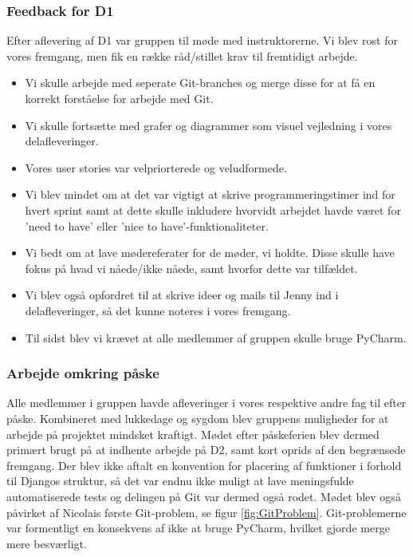 \documentclass[]{article}
\begin{document}
\subsubsection{Feedback for D1}
Efter aflevering af D1 var gruppen til møde med instruktorerne. Vi blev rost for vores fremgang, men fik en række råd/stillet krav til fremtidigt arbejde.
\begin{itemize}
    \item Vi skulle arbejde med seperate Git-branches og merge disse for at få en korrekt forståelse for arbejde med Git.
    \item Vi skulle fortsætte med grafer og diagrammer som visuel vejledning i vores delafleveringer.
    \item Vores user stories var velpriorterede og veludformede.
    \item Vi blev mindet om at det var vigtigt at skrive programmeringstimer ind for hvert sprint samt at dette skulle inkludere hvorvidt arbejdet havde været for 'need to have' eller 'nice to have'-funktionaliteter.
    \item Vi bedt om at lave mødereferater for de møder, vi holdte. Disse skulle have fokus på hvad vi nåede/ikke nåede, samt hvorfor dette var tilfældet. 
    \item Vi blev også opfordret til at skrive ideer og mails til Jenny ind i delafleveringer, så det kunne noteres i vores fremgang. 
    \item Til sidst blev vi krævet at alle medlemmer af gruppen skulle bruge PyCharm. 
\end{itemize}

\subsubsection{Arbejde omkring påske}
Alle medlemmer i gruppen havde afleveringer i vores respektive andre fag til efter påske. Kombineret med lukkedage og sygdom blev gruppens muligheder for at arbejde på projektet mindsket kraftigt. Mødet efter påskeferien blev dermed primært brugt på at indhente arbejde på D2, samt kort oprids af den begrænsede fremgang. Der blev ikke aftalt en konvention for placering af funktioner i forhold til Djangos struktur, så det var endnu ikke muligt at lave meningsfulde automatiserede tests og delingen på Git var dermed også rodet. Mødet blev også påvirket af Nicolais første Git-problem, se figur \ref{fig:GitProblem}. Git-problemerne var formentligt en konsekvens af ikke at bruge PyCharm, hvilket gjorde merge mere besværligt. 
\end{document}
